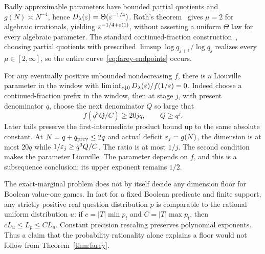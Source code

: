 Badly approximable parameters have bounded partial quotients and $g(N)\asymp N^{-4}$, hence $D_\lambda(\varepsilon)=\Theta(\varepsilon^{-1/4})$. Roth's theorem~\cite{Roth} gives $\mu=2$ for algebraic irrationals, yielding $\varepsilon^{-1/4+o(1)}$, without asserting a uniform $\Theta$ law for every algebraic parameter. The standard continued-fraction construction~\cite[Chapter 1]{Bugeaud}, choosing partial quotients with prescribed $\limsup\log q_{j+1}/\log q_j$ realizes every $\mu\in[2,\infty]$, so the entire curve~\eqref{eq:farey-endpoints} occurs.

For any eventually positive unbounded nondecreasing $f$, there is a Liouville parameter in the window with $\liminf_{\varepsilon\downarrow0}D_\lambda(\varepsilon)/f(1/\varepsilon)=0$. Indeed choose a continued-fraction prefix in the window, then at stage $j$, with present denominator $q$, choose the next denominator $Q$ so large that
\[
 f(q^3Q/C)\ge20jq,\qquad Q\ge q^j.
\]
Later tails preserve the first-intermediate product bound up to the same absolute constant. At $N=q+q_{\rm prev}\le2q$ and actual deficit $\varepsilon_j=g(N)$, the dimension is at most $20q$ while $1/\varepsilon_j\ge q^3Q/C$. The ratio is at most $1/j$. The second condition makes the parameter Liouville. The parameter depends on $f$, and this is a subsequence conclusion; its upper exponent remains $1/2$.

The exact-marginal problem does not by itself decide any dimension floor for Boolean value-one games. In fact for a fixed Boolean predicate and finite support, any strictly positive real question distribution $p$ is comparable to the rational uniform distribution $u$: if $c=|T|\min p_t$ and $C=|T|\max p_t$, then $cL_u\le L_p\le CL_u$. Constant precision rescaling preserves polynomial exponents. Thus a claim that the probability rationality alone explains a floor would not follow from Theorem~\ref{thm:farey}.

